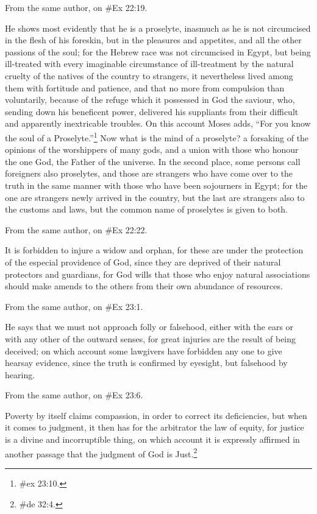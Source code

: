 From the same author, on \#Ex 22:19.

He shows most evidently that he is a proselyte, inasmuch as he is not circumcised in the flesh of his
foreskin, but in the pleasures and appetites, and all the other passions of the soul; for the Hebrew race
was not circumcised in Egypt, but being ill-treated with every imaginable circumstance of ill-treatment
by the natural cruelty of the natives of the country to strangers, it nevertheless lived among them with
fortitude and patience, and that no more from compulsion than voluntarily, because of the refuge which
it possessed in God the saviour, who, sending down his beneficent power, delivered his suppliants from
their difficult and apparently inextricable troubles. On this account Moses adds, ``For you know the soul
of a Proselyte.''\footnote{\#ex 23:10.} Now what is the mind of a proselyte? a forsaking of the opinions of
the worshippers of many gods, and a union with those who honour the one God, the Father of the
universe. In the second place, some persons call foreigners also proselytes, and those are
strangers who have come over to the truth in the same manner with those who have been
sojourners in Egypt; for the one are strangers newly arrived in the country, but the last are
strangers also to the customs and laws, but the common name of proselytes is given to both.

From the same author, on \#Ex 22:22.

It is forbidden to injure a widow and orphan, for these are under the protection of the especial
providence of God, since they are deprived of their natural protectors and guardians, for God wills
that those who enjoy natural associations should make amends to the others from their own
abundance of resources.

From the same author, on \#Ex 23:1.

He says that we must not approach folly or falsehood, either with the ears or with any other of the
outward senses, for great injuries are the result of being deceived; on which account some
lawgivers have forbidden any one to give hearsay evidence, since the truth is confirmed by
eyesight, but falsehood by hearing.

From the same author, on \#Ex 23:6.

Poverty by itself claims compassion, in order to correct its deficiencies, but when it comes to
judgment, it then has for the arbitrator the law of equity, for justice is a divine and incorruptible
thing, on which account it is expressly affirmed in another passage that the judgment of God is
Just.\footnote{\#de 32:4.}

